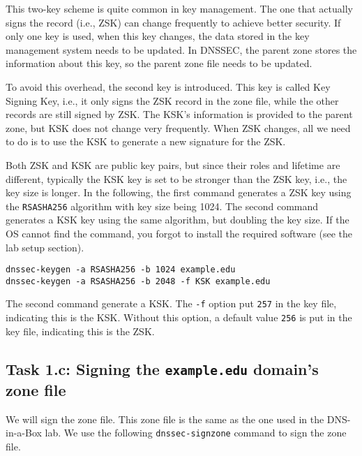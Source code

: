 This two-key scheme is quite common in key management. The one that actually signs the record
(i.e., ZSK) can change frequently to achieve better security. If only one key is used,
when this key changes, the data stored in the key management system needs to be updated. 
In DNSSEC, the parent zone stores the information about this key, so the parent zone file
needs to be updated. 

To avoid this overhead, the second key is introduced. This key is called 
Key Signing Key, i.e., it only signs the ZSK record in the zone file, while the 
other records are still signed by ZSK. The KSK's information is provided to 
the parent zone, but KSK does not change very frequently. When ZSK changes,
all we need to do is to use the KSK to generate a new signature for the ZSK. 

Both ZSK and KSK are public key pairs, but since their roles and lifetime are different,
typically the KSK key is set to be stronger than the ZSK key, i.e., the key size 
is longer. In the following, the first command generates a ZSK key using the 
\texttt{RSASHA256} algorithm with key size being 1024. The second command 
generates a KSK key using the same algorithm, but doubling the key size. 
If the OS cannot find the command, you forgot to 
install the required software (see the lab setup section).


\begin{lstlisting}
dnssec-keygen -a RSASHA256 -b 1024 example.edu
dnssec-keygen -a RSASHA256 -b 2048 -f KSK example.edu
\end{lstlisting}

The second command generate a KSK. The \texttt{-f} option 
put \texttt{257} in the key file, indicating this is the KSK. 
Without this option, a default value \texttt{256} is put in
the key file, indicating this is the ZSK.





\subsection{Task 1.c: Signing the \texttt{example.edu} domain's zone file} 

We will sign the zone file. This zone file 
is the same as the one used in the DNS-in-a-Box lab. We use the 
following \texttt{dnssec-signzone} command to sign the zone file.  


